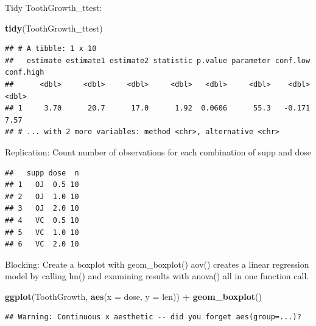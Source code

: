 \documentclass[]{book}
\newenvironment{Shaded}{\begin{snugshade}}{\end{snugshade}}
\newcommand{\DataTypeTok}[1]{\textcolor[rgb]{0.13,0.29,0.53}{#1}}
\newcommand{\KeywordTok}[1]{\textcolor[rgb]{0.13,0.29,0.53}{\textbf{#1}}}
\newcommand{\NormalTok}[1]{#1}
\newcommand{\OperatorTok}[1]{\textcolor[rgb]{0.81,0.36,0.00}{\textbf{#1}}}
\newcommand{\StringTok}[1]{\textcolor[rgb]{0.31,0.60,0.02}{#1}}
\begin{document}
Tidy ToothGrowth\_ttest:

\begin{Shaded}
\begin{Highlighting}[]
\KeywordTok{tidy}\NormalTok{(ToothGrowth_ttest)}
\end{Highlighting}
\end{Shaded}

\begin{verbatim}
## # A tibble: 1 x 10
##   estimate estimate1 estimate2 statistic p.value parameter conf.low conf.high
##      <dbl>     <dbl>     <dbl>     <dbl>   <dbl>     <dbl>    <dbl>     <dbl>
## 1     3.70      20.7      17.0      1.92  0.0606      55.3   -0.171      7.57
## # ... with 2 more variables: method <chr>, alternative <chr>
\end{verbatim}

Replication:
Count number of observations for each combination of supp and dose

\begin{Shaded}
\end{Shaded}

\begin{verbatim}
##   supp dose  n
## 1   OJ  0.5 10
## 2   OJ  1.0 10
## 3   OJ  2.0 10
## 4   VC  0.5 10
## 5   VC  1.0 10
## 6   VC  2.0 10
\end{verbatim}

Blocking:
Create a boxplot with geom\_boxplot()
aov() creates a linear regression model by calling lm() and examining results with anova() all in one function call.

\begin{Shaded}
\begin{Highlighting}[]
\KeywordTok{ggplot}\NormalTok{(ToothGrowth, }\KeywordTok{aes}\NormalTok{(}\DataTypeTok{x =}\NormalTok{ dose, }\DataTypeTok{y =}\NormalTok{ len)) }\OperatorTok{+}\StringTok{ }
\StringTok{  }\KeywordTok{geom_boxplot}\NormalTok{()}
\end{Highlighting}
\end{Shaded}

\begin{verbatim}
## Warning: Continuous x aesthetic -- did you forget aes(group=...)?
\end{verbatim}
\end{document}
